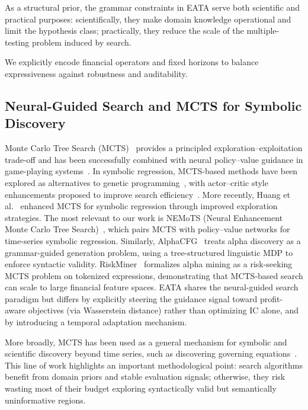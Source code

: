 As a structural prior, the grammar constraints in EATA serve both scientific and practical purposes: scientifically, they make domain knowledge operational and limit the hypothesis class; practically, they reduce the scale of the multiple-testing problem induced by search.

We explicitly encode financial operators and fixed horizons to balance expressiveness against robustness and auditability.

\subsection{Neural-Guided Search and MCTS for Symbolic Discovery}

Monte Carlo Tree Search (MCTS)~\cite{coulom2006efficient,kocsis2006bandit} provides a principled exploration--exploitation trade-off and has been successfully combined with neural policy--value guidance in game-playing systems~\cite{silver2016mastering,silver2017mastering}. In symbolic regression, MCTS-based methods have been explored as alternatives to genetic programming~\cite{white2015programming,cazenave2013monte}, with actor--critic style enhancements proposed to improve search efficiency~\cite{lu2021incorporating}. More recently, Huang et al.~\cite{huang2025improving} enhanced MCTS for symbolic regression through improved exploration strategies. The most relevant to our work is NEMoTS (Neural Enhancement Monte Carlo Tree Search)~\cite{xie2024nemots}, which pairs MCTS with policy--value networks for time-series symbolic regression. Similarly, AlphaCFG~\cite{yang2026alpha} treats alpha discovery as a grammar-guided generation problem, using a tree-structured linguistic MDP to enforce syntactic validity. RiskMiner~\cite{ren2024riskminer} formalizes alpha mining as a risk-seeking MCTS problem on tokenized expressions, demonstrating that MCTS-based search can scale to large financial feature spaces. EATA shares the neural-guided search paradigm but differs by explicitly steering the guidance signal toward profit-aware objectives (via Wasserstein distance) rather than optimizing IC alone, and by introducing a temporal adaptation mechanism.

More broadly, MCTS has been used as a general mechanism for symbolic and scientific discovery beyond time series, such as discovering governing equations~\cite{sun2022symbolic}. This line of work highlights an important methodological point: search algorithms benefit from domain priors and stable evaluation signals; otherwise, they risk wasting most of their budget exploring syntactically valid but semantically uninformative regions.

